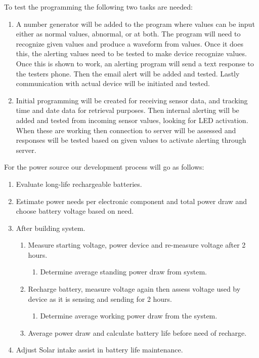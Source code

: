 \documentclass[12pt]{article}
\begin{document}
To test the programming the following two tasks are needed:
\begin{enumerate}
\item  A number generator will be added to the program where values can be input either as normal values, abnormal, or at both.  The program will need to recognize given values and produce a waveform from values.  Once it does this, the alerting values need to be tested to make device recognize values.  Once this is shown to work, an alerting program will send a text response to the testers phone.  Then the email alert will be added and tested.  Lastly communication with actual device will be initiated and tested.

\item Initial programming will be created for receiving sensor data, and tracking time and date data for retrieval purposes.  Then internal alerting will be added and tested from incoming sensor values, looking for LED activation.  When these are working then connection to server will be assessed and responses will be tested based on given values to activate alerting through server.  \\
\end{enumerate}

For the power source our development process will go as follows:

\begin{enumerate}
	\item Evaluate long-life rechargeable batteries.
	\item Estimate power needs per electronic component and total power draw and choose battery voltage based on need.
	\item After building system.
	\begin{enumerate}
		\item 	Measure starting voltage, power device and re-measure voltage after 2 hours.
		\begin{enumerate}
			\item Determine average standing power draw from system.
		\end{enumerate}
		\item Recharge battery, measure voltage again then assess voltage used by device as it is sensing and sending for 2 hours.
		\begin{enumerate}
			\item Determine average working power draw from the system.
		\end{enumerate}
		\item Average power draw and calculate battery life before need of recharge.  
	\end{enumerate}
	\item Adjust Solar intake assist in battery life maintenance.
	
\end{enumerate}
\end{document}
